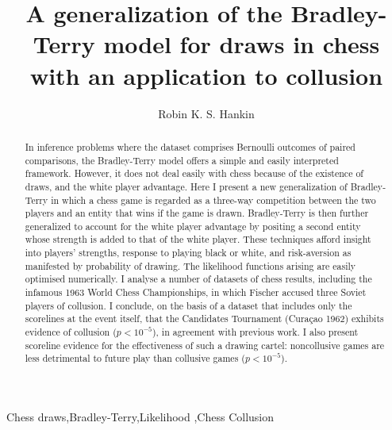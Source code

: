 \documentclass[review]{elsarticle}
\begin{document}
\begin{frontmatter}

\title{A generalization of the Bradley-Terry model for draws in chess with an application to collusion}

\author{Robin K. S. Hankin}
\address{AUT University, 2-14 Wakefield Street, Auckland, New Zealand}



\begin{abstract}
In inference problems where the dataset comprises Bernoulli outcomes
of paired comparisons, the Bradley-Terry model offers a simple and
easily interpreted framework.  However, it does not deal easily with
chess because of the existence of draws, and the white player
advantage.  Here I present a new generalization of Bradley-Terry in
which a chess game is regarded as a three-way competition between the
two players and an entity that wins if the game is drawn.
Bradley-Terry is then further generalized to account for the white
player advantage by positing a second entity whose strength is added
to that of the white player.  These techniques afford insight into
players' strengths, response to playing black or white, and
risk-aversion as manifested by probability of drawing.  The likelihood
functions arising are easily optimised numerically.  I analyse a
number of datasets of chess results, including the infamous 1963 World
Chess Championships, in which Fischer accused three Soviet players of
collusion.  I conclude, on the basis of a dataset that includes only
the scorelines at the event itself, that the Candidates Tournament
(Cura\c{c}ao 1962) exhibits evidence of collusion ($p<10^{-5}$), in
agreement with previous work.  I also present
  scoreline evidence for the effectiveness of such a drawing cartel:
  noncollusive games are less detrimental to future play than
  collusive games ($p<10^{-5}$).
\end{abstract}

\begin{keyword}
  Chess draws\sep Bradley-Terry\sep Likelihood \sep Chess Collusion
\end{keyword}

\end{frontmatter}

\linenumbers

\newcommand\headercell[1]{%
   \smash[b]{\begin{tabular}[t]{@{}c@{}} #1 \end{tabular}}}
\newcommand{\draw}{\ensuremath{\mathfrak{D}}}
\newcommand{\cdraw}{\ensuremath{\mathfrak{C}}}
\newcommand{\white}{\ensuremath{\mathfrak{W}}}
\newcommand{\Prob}{\operatorname{Prob}}
\end{document}
